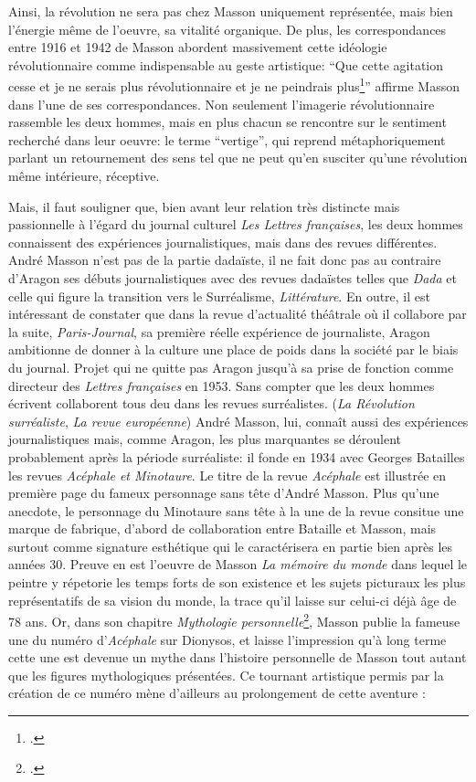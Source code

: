 Ainsi, la révolution ne sera pas chez Masson uniquement représentée, mais bien l’énergie même de l’oeuvre, sa vitalité organique. De plus, les correspondances  entre 1916 et 1942 de Masson abordent massivement cette idéologie  révolutionnaire comme indispensable au geste artistique: \enquote{Que cette agitation cesse et je ne serais plus révolutionnaire et je ne peindrais plus\footcite[p. 102]{anneessurrealistes}} affirme Masson dans l’une de ses correspondances. Non seulement l’imagerie révolutionnaire rassemble les deux hommes, mais en plus chacun se rencontre sur le sentiment recherché dans leur oeuvre: le terme \enquote{vertige}, qui reprend métaphoriquement parlant un retournement des sens tel que ne peut qu’en susciter qu’une révolution même intérieure, réceptive. 

Mais, il faut souligner que, bien avant leur relation très distincte mais passionnelle à l’égard du journal culturel \emph{Les Lettres françaises}, les deux hommes connaissent des expériences journalistiques, mais dans des revues différentes. André Masson n’est pas de la partie dadaïste, il ne fait donc pas au contraire d’Aragon ses débuts journalistiques avec des revues dadaïstes telles que \emph{Dada} et celle qui figure la transition vers le Surréalisme, \emph{Littérature}. En outre, il est intéressant de constater que dans la revue d’actualité théâtrale où il collabore par la suite, \emph{Paris-Journal}, sa première réelle expérience de journaliste, Aragon ambitionne de donner à la culture une place de poids dans la société par le biais du journal. Projet qui ne quitte pas Aragon jusqu’à sa prise de fonction comme directeur des \emph{Lettres françaises} en 1953. Sans compter que les deux hommes écrivent collaborent tous deu dans les revues surréalistes. (\emph{La Révolution surréaliste}, \emph{La revue européenne}) André Masson, lui,  connaît aussi des expériences journalistiques mais, comme Aragon, les plus marquantes se déroulent probablement après la période surréaliste: il fonde en 1934 avec Georges Batailles les revues \emph{Acéphale et Minotaure}. Le titre de la revue \emph{Acéphale} est illustrée en première page du fameux personnage sans tête d’André Masson. Plus qu'une anecdote, le personnage du Minotaure sans tête à la une de la revue consitue une marque de fabrique, d'abord de collaboration entre Bataille et Masson, mais surtout comme signature esthétique qui le caractérisera en partie bien après les années 30. Preuve en est l'oeuvre de Masson \emph{La mémoire du monde} dans lequel le peintre y répetorie les temps forts de son existence et les sujets picturaux les plus  représentatifs de sa vision du monde, la trace qu'il laisse sur celui-ci déjà âge de 78 ans. Or, dans son chapitre \emph{Mythologie personnelle}\footcite[p124]{memoiremonde}, Masson publie la fameuse une du numéro d'\emph{Acéphale}
 sur Dionysos, et laisse l'impression qu'à long terme cette une est devenue un mythe dans l'histoire personnelle de Masson tout autant que les figures mythologiques présentées. Ce tournant artistique permis par la création de ce numéro mène d'ailleurs au prolongement de cette aventure : 
 
